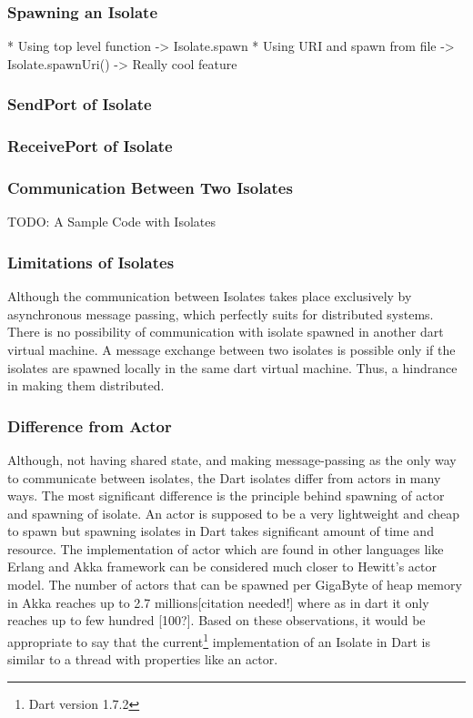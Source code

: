   \subsubsection{Spawning an Isolate}
  * Using top level function -> Isolate.spawn
  * Using URI and spawn from file -> Isolate.spawnUri()
    -> Really cool feature
    
  \subsubsection{SendPort of Isolate}
  \subsubsection{ReceivePort of Isolate}
  \subsubsection{Communication Between Two Isolates}
  TODO: A Sample Code with Isolates

  \subsubsection{Limitations of Isolates}
  Although the communication between Isolates takes place exclusively by asynchronous message passing, which perfectly suits for distributed systems. There is no possibility of communication with isolate spawned in another dart virtual machine. A message exchange between two isolates is possible only if the isolates are spawned locally in the same dart virtual machine. Thus, a hindrance in making them distributed.

  \subsubsection{Difference from Actor}
Although, not having shared state, and making message-passing as the only way to communicate between isolates, the Dart isolates differ from actors in many ways. The most significant difference is the principle behind spawning of actor and spawning of isolate. An actor is supposed to be a very lightweight and cheap to spawn but spawning isolates in Dart takes significant amount of time and resource. The implementation of actor which are found in other languages like Erlang and Akka framework can be considered much closer to Hewitt's actor model. The number of actors that can be spawned per GigaByte of heap memory in Akka reaches up to 2.7 millions[citation needed!] where as in dart it only reaches up to few hundred [100?]. Based on these observations, it would be appropriate to say that the current\footnote{Dart version 1.7.2} implementation of an Isolate in Dart is \textemdash{} similar to a thread with properties like an actor.


